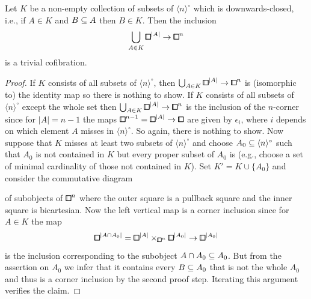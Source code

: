 \begin{proposition}\label{prop:triv-nilcofib-simp}
Let $K$ be a non-empty collection of subsets of $\langle n\rangle^\circ$ which is downwards-closed,
i.e., if $A\in K$ and $B\subseteq A$ then $B\in K$.
Then the inclusion
\[
    \bigcup_{A\in K}{\bbox}^{\lvert A\rvert}\to{\bbox}^n
\]
is a trivial cofibration.
\end{proposition}

\begin{proof}
If $K$ consists of all subsets of $\langle n\rangle^\circ$,
then $\bigcup_{A\in K}{\bbox}^{\lvert A\rvert}\to{\bbox}^n$ is (isomorphic to) the identity map
so there is nothing to show.
If $K$ consists of all subsets of $\langle n\rangle^\circ$ except the whole set
then $\bigcup_{A\in K}{\bbox}^{\lvert A\rvert}\to{\bbox}^n$ is the inclusion of the $n$-corner
since for $\lvert A\rvert = n-1$ the maps ${\bbox}^{n-1}={\bbox}^{\lvert A\rvert}\to{\bbox}$
are given by $\epsilon_i$, where $i$ depends on which element $A$ misses in $\langle n\rangle^\circ$.
So again, there is nothing to show.
Now suppose that $K$ misses at least two subsets of $\langle n\rangle^\circ$
and choose $A_0\subseteq\langle n\rangle^\circ$ such that $A_0$ is not contained in $K$
but every proper subset of $A_0$ is (e.g., choose a set of minimal cardinality of those not contained in $K$).
Set $K' = K\cup\{A_0\}$ and consider the commutative diagram
\begin{center}
\end{center}
of subobjects of ${\bbox}^n$ where the outer square is a pullback square
and the inner square is bicartesian.
Now the left vertical map is a corner inclusion since for $A\in K$ the map
\[
    {\bbox}^{\lvert A\cap A_0\rvert}
    ={\bbox}^{\lvert A\rvert}\times_{{\bbox}^n}{\bbox}^{\lvert A_0\rvert}
    \to{\bbox}^{\lvert A_0\rvert}
\]
is the inclusion corresponding to the subobject $A\cap A_0\subseteq A_0$.
But from the assertion on $A_0$ we infer that it contains every $B\subseteq A_0$ that is not the whole $A_0$
and thus is a corner inclusion by the second proof step.
Iterating this argument verifies the claim.
\end{proof}

